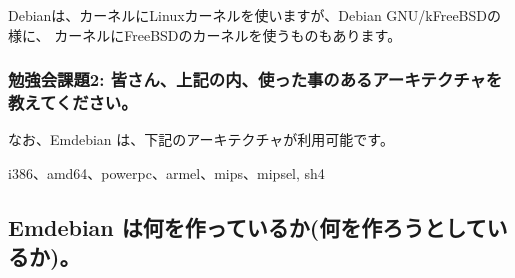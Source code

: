 \documentclass[mingoth,a4paper]{jsarticle}
\begin{document}
Debianは、カーネルにLinuxカーネルを使いますが、Debian GNU/kFreeBSDの様に、
カーネルにFreeBSDのカーネルを使うものもあります。

\subsubsection{勉強会課題2: 皆さん、上記の内、使った事のあるアーキテクチャを教えてください。}

なお、Emdebian は、下記のアーキテクチャが利用可能です。

i386、amd64、powerpc、armel、mips、mipsel, sh4

\subsection{Emdebian は何を作っているか(何を作ろうとしているか)。}
\end{document}
